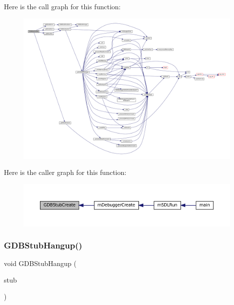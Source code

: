 Here is the call graph for this function\+:
\nopagebreak
\begin{figure}[H]
\begin{center}
\leavevmode
\includegraphics[width=350pt]{gdb-stub_8c_a22597ba75b0b4cfd482b774f19d0200a_cgraph}
\end{center}
\end{figure}
Here is the caller graph for this function\+:
\nopagebreak
\begin{figure}[H]
\begin{center}
\leavevmode
\includegraphics[width=350pt]{gdb-stub_8c_a22597ba75b0b4cfd482b774f19d0200a_icgraph}
\end{center}
\end{figure}
\mbox{\label{gdb-stub_8c_a28c1b7ad1cc9e5dbf3a8204d45ee2813}} 
\subsubsection{\texorpdfstring{G\+D\+B\+Stub\+Hangup()}{GDBStubHangup()}}
{\footnotesize\ttfamily void G\+D\+B\+Stub\+Hangup (\begin{DoxyParamCaption}\item[{struct G\+D\+B\+Stub $\ast$}]{stub }\end{DoxyParamCaption})}

